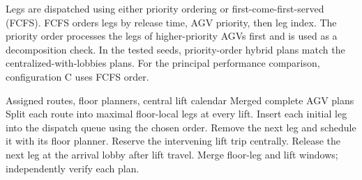 Legs are dispatched using either priority ordering or first-come-first-served
(FCFS). FCFS orders legs by release time, AGV priority, then leg index. The
priority order processes the legs of higher-priority AGVs first and is used
as a decomposition check. In the tested seeds, priority-order hybrid plans
match the centralized-with-lobbies plans. For the principal performance
comparison, configuration C uses FCFS order.

\begin{algorithm}[t]
\caption{Hybrid floor-leg planning and lift booking}
\label{alg:hybrid}
\begin{algorithmic}[1]
\REQUIRE Assigned routes, floor planners, central lift calendar
\ENSURE Merged complete AGV plans
\STATE Split each route into maximal floor-local legs at every lift.
\STATE Insert each initial leg into the dispatch queue using the chosen order.
  \STATE Remove the next leg and schedule it with its floor planner.
    \STATE Reserve the intervening lift trip centrally.
    \STATE Release the next leg at the arrival lobby after lift travel.
  \ENDIF
\ENDWHILE
\STATE Merge floor-leg and lift windows; independently verify each plan.
\end{algorithmic}
\end{algorithm}
